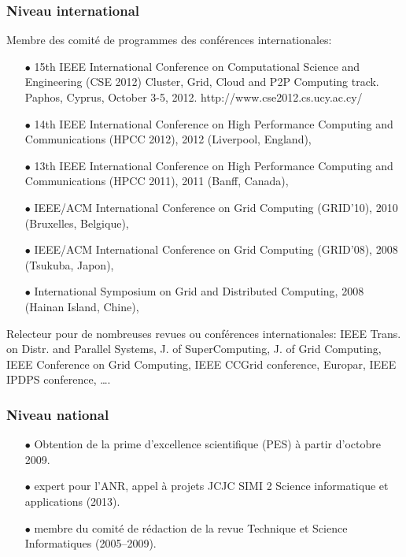 \documentclass[11pt]{article}
\begin{document}
\subsubsection{Niveau international}
Membre des comité de programmes des conférences internationales:\\[-3mm]
\begin{itemize}
\item[$\bullet$]
15th IEEE International Conference on Computational Science and Engineering (CSE 2012) 
Cluster, Grid, Cloud and P2P Computing track. Paphos, Cyprus, October 3-5, 2012. 
http://www.cse2012.cs.ucy.ac.cy/

\item[$\bullet$] 
14th IEEE International Conference on High Performance Computing and Communications (HPCC 2012), 
2012 (Liverpool, England),
\item[$\bullet$] 
13th IEEE International Conference on High Performance Computing and Communications (HPCC 2011), 
2011 (Banff, Canada),
\item[$\bullet$] 
IEEE/ACM International Conference on Grid Computing (GRID'10), 2010 (Bruxelles, Belgique),
\item[$\bullet$] 
IEEE/ACM International Conference on Grid Computing (GRID'08), 2008 (Tsukuba, Japon), 
\item [$\bullet$]
International Symposium on Grid and Distributed Computing, 2008 (Hainan Island, Chine),\\
\end{itemize}

Relecteur pour de nombreuses revues ou conférences internationales: IEEE Trans. on Distr. and Parallel Systems, 
J. of SuperComputing, J. of Grid Computing, IEEE Conference on Grid Computing, IEEE CCGrid conference, Europar,
IEEE IPDPS conference, \ldots.


\subsubsection{Niveau national}
\begin{itemize}


\item[$\bullet$] Obtention de la prime d'excellence scientifique (PES) à partir d'octobre 2009.\\

\item [$\bullet$]
expert pour l'ANR, appel à projets JCJC SIMI 2 Science informatique et applications (2013).\\

\item [$\bullet$]
membre du comité de rédaction de la revue Technique et Science Informatiques (2005--2009).\\
\end{itemize}
\end{document}
